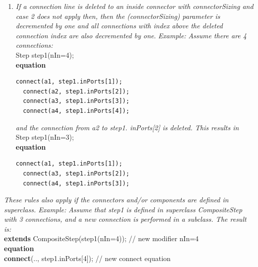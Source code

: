\documentclass[10pt,a4paper]{report}
\begin{document}
\begin{enumerate}
{  incremented by one and the connection is performed for the new highest
  index. Example:} \emph{Assume that 3 connections are present and a new
  connection is performed. The result is:\\}
\begin{lstlisting}[language=modelica]
    Step step1(nIn=4); // index changed from nIn=3 to nIn=4
  equation
    connect(.., step1.inPorts[4]); // new connect equation
\end{lstlisting}
  \emph{In some applications, like state machines, the vector index is
  used as a priority, e.g., to define which transition is firing if
  several transitions become active at the same time instant. It is then
  not sufficient to only provide a mechanism to always connect to the
  last index. Instead, some mechanism to select an index conveniently
  should be provided. }
\item
  \emph{If a connection line is deleted to an inside connector with
  connectorSizing and case 2 does not apply then, then the
  (connectorSizing) parameter is decremented by one and all connections
  with index above the deleted connection index are also decremented by
  one}. \emph{Example:} \emph{Assume there are 4 connections:}\\
  Step step1(nIn=4);\\
  \textbf{equation\\}
\begin{lstlisting}[language=modelica]
  connect(a1, step1.inPorts[1]);
  connect(a2, step1.inPorts[2]);
  connect(a3, step1.inPorts[3]);
  connect(a4, step1.inPorts[4]);
\end{lstlisting}
  \emph{and the connection from a2 to step1. inPorts{[}2{]} is deleted.
  This results in\\
  } Step step1(nIn=3);\\
  \textbf{equation\\}
\begin{lstlisting}[language=modelica]
  connect(a1, step1.inPorts[1]);
  connect(a3, step1.inPorts[2]);
  connect(a4, step1.inPorts[3]);
\end{lstlisting}
\end{enumerate}

\emph{These rules also apply if the connectors and/or components are
defined in {superclass}. Example:} \emph{Assume that step1 is defined in
superclass CompositeStep with 3 connections, and a new connection is
performed in a subclass. The result is:}\\
\textbf{extends} CompositeStep(step1(nIn=4)); // new modifier nIn=4\\
\textbf{equation}\\
\textbf{connect}(.., step1.inPorts{[}4{]}); // new connect equation
\end{document}
